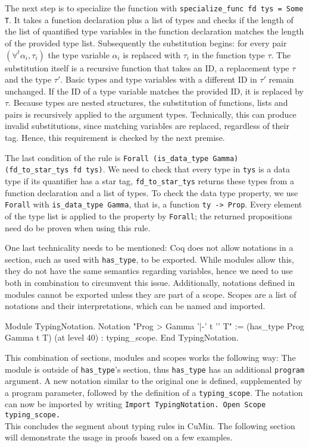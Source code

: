 \documentclass[fleqn]{scrreprt}
\newcommand{\coqinline}[1]{\texttt{#1}}
\begin{document}
 \par
 The next step is to specialize the function with \coqinline{specialize_func fd tys = Some T}. It takes a function declaration plus a list of types and checks if the length of the list of quantified type variables in the function declaration matches the length of the provided type list. Subsequently the substitution begins: for every pair $(\forall^{t}\alpha_{i}, \tau_{i})$ the type variable $\alpha_{i}$ is replaced with $\tau_{i}$ in the function type $\tau$. The substitution itself is a recursive function that takes an ID, a replacement type $\tau$ and the type $\tau'$. Basic types and type variables with a different ID in $\tau'$ remain unchanged. If the ID of a type variable matches the provided ID, it is replaced by $\tau$. Because types are nested structures, the substitution of functions, lists and pairs is recursively applied to the argument types. Technically, this can produce invalid substitutions, since matching variables are replaced, regardless of their tag. Hence, this requirement is checked by the next premise.
 \par
 The last condition of the rule is \coqinline{Forall (is_data_type Gamma) (fd_to_star_tys fd tys)}. We need to check that every type in \coqinline{tys} is a data type if its quantifier has a star tag, \coqinline{fd_to_star_tys} returns these types from a function declaration and a list of types. To check the data type property, we use \coqinline{Forall} with \coqinline{is_data_type Gamma}, that is, a function \coqinline{ty -> Prop}. Every element of the type list is applied to the property by \coqinline{Forall}; the returned propositions need do be proven when using this rule.
 \par
 One last technicality needs to be mentioned: Coq does not allow notations in a section, such as used with \coqinline{has_type}, to be exported. While modules allow this, they do not have the same semantics regarding variables, hence we need to use both in combination to circumvent this issue. Additionally, notations defined in modules cannot be exported unless they are part of a scope. Scopes are a list of notations and their interpretations, which can be named and imported.
 \begin{coqcode}
 Module TypingNotation.
   Notation "Prog > Gamma '|-' t '\in' T" := (has_type Prog Gamma t T)
   (at level 40) : typing_scope.
 End TypingNotation.
 \end{coqcode}
 This combination of sections, modules and scopes works the following way: The module is outside of \coqinline{has_type}'s section, thus \coqinline{has_type} has an additional \coqinline{program} argument. A new notation similar to the original one is defined, supplemented by a program parameter, followed by the definition of a \coqinline{typing_scope}.
 The notation can now be imported by writing \coqinline{Import TypingNotation. Open Scope typing_scope.}\\
 This concludes the segment about typing rules in CuMin. The following section will demonstrate the usage in proofs based on a few examples.
\end{document}

